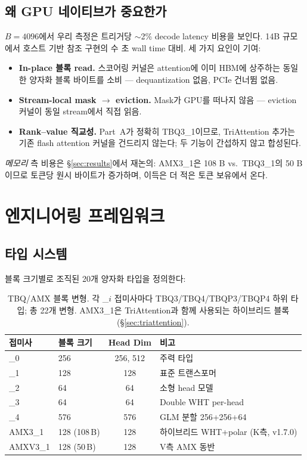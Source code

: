 \documentclass[10pt,twocolumn]{article}
\begin{document}
\subsection{왜 GPU 네이티브가 중요한가}

$B = 4096$에서 우리 측정은 트리거당 $\sim$2\% decode latency 비용을 보인다. 14B 규모에서 호스트 기반 참조 구현의 수 초 wall time 대비. 세 가지 요인이 기여:

\begin{itemize}[leftmargin=*,topsep=2pt,itemsep=1pt]
\item \textbf{In-place 블록 read.} 스코어링 커널은 attention에 이미 HBM에 상주하는 동일한 양자화 블록 바이트를 소비 --- dequantization 없음, PCIe 건너뜀 없음.
\item \textbf{Stream-local mask $\to$ eviction.} Mask가 GPU를 떠나지 않음 --- eviction 커널이 동일 stream에서 직접 읽음.
\item \textbf{Rank--value 직교성.} Part~A가 정확히 TBQ3\_1이므로, TriAttention 추가는 기존 flash attention 커널을 건드리지 않는다; 두 기능이 간섭하지 않고 합성된다.
\end{itemize}

\emph{메모리} 측 비용은 \S\ref{sec:results}에서 재논의: AMX3\_1은 108 B vs.\ TBQ3\_1의 50 B이므로 토큰당 원시 바이트가 증가하며, 이득은 더 적은 토큰 보유에서 온다.

\section{엔지니어링 프레임워크}
\label{sec:engineering}

\subsection{타입 시스템}

블록 크기별로 조직된 20개 양자화 타입을 정의한다:

\begin{table}[h]
\centering
\small
\begin{tabular}{@{}llcl@{}}
\toprule
접미사 & 블록 크기 & Head Dim & 비고 \\
\midrule
\_0 & 256 & 256, 512 & 주력 타입 \\
\_1 & 128 & 128 & 표준 트랜스포머 \\
\_2 & 64  & 64  & 소형 head 모델 \\
\_3 & 64  & 64  & Double WHT per-head \\
\_4 & 576 & 576 & GLM 분할 256+256+64 \\
\midrule
AMX3\_1  & 128 (108\,B) & 128 & 하이브리드 WHT+polar (K측, v1.7.0) \\
AMXV3\_1 & 128 (50\,B)  & 128 & V측 AMX 동반 \\
\bottomrule
\end{tabular}
\caption{TBQ/AMX 블록 변형. 각 \_$i$ 접미사마다 TBQ3/TBQ4/TBQP3/TBQP4 하위 타입; 총 22개 변형. AMX3\_1은 TriAttention과 함께 사용되는 하이브리드 블록(\S\ref{sec:triattention}).}
\label{tab:types}
\end{table}
\end{document}
